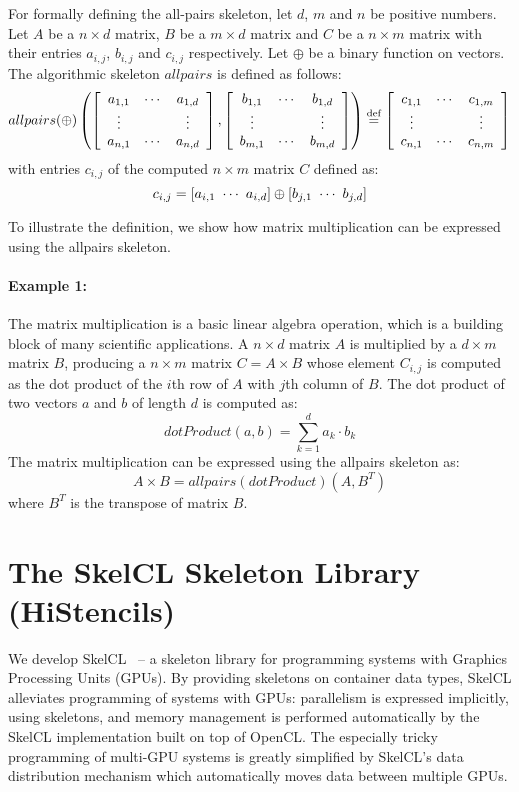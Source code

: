For formally defining the all-pairs skeleton, let $d$, $m$ and $n$ be positive numbers.
  Let $A$ be a $n\times d$ matrix, $B$ be a $m\times d$ matrix and $C$ be a $n\times m$ matrix with their entries $a_{i,j}$, $b_{i,j}$ and $c_{i,j}$ respectively.
  Let $\oplus$ be a binary function on vectors. %
  The algorithmic skeleton $allpairs$ is defined as follows:
  \[
	  allpairs(\oplus)\left(\DottedMatrix{a_{1,1}}{a_{1,d}}{a_{n,1}}{a_{n,d}},%
	                           \DottedMatrix{b_{1,1}}{b_{1,d}}{b_{m,1}}{b_{m,d}}\right)%
  	\eqdef \DottedMatrix{c_{1,1}}{c_{1,m}}{c_{n,1}}{c_{n,m}}
  \]
  with entries $c_{i,j}$ of the computed $n\times m$ matrix $C$ defined as:
  \[
	  c_{i,j} = \left[a_{i,1}\ \cdots\ a_{i,d}\right] \oplus \left[b_{j,1}\ \cdots\ b_{j,d}\right]
  \]

To illustrate the definition, we show how matrix multiplication can be expressed using the allpairs skeleton.

\paragraph{Example 1:}
The matrix multiplication is a basic linear algebra operation, which is a building block of many scientific applications.
A $n\times d$ matrix $A$ is multiplied by a $d\times m$ matrix $B$, producing a $n\times m$ matrix $C=A\times B$ whose element $C_{i,j}$ is computed as the dot product of the $i$th row of $A$ with $j$th column of $B$.
The dot product of two vectors $a$ and $b$ of length $d$ is computed as:
\begin{equation}
  dotProduct(a,b) = \sum_{k=1}^d a_k \cdot b_k
\end{equation}
The matrix multiplication can be expressed using the allpairs skeleton as:
\begin{equation}
  A\times B = allpairs(dotProduct)\left(A, B^T\right)
  \label{eq:mat_mult_allpairs}
\end{equation}
where $B^T$ is the transpose of matrix $B$.




\section{The SkelCL Skeleton Library (HiStencils)}
\label{sec:skelcl}
We develop SkelCL~\cite{StG-13b} -- a skeleton library for programming systems with Graphics Processing Units (GPUs).
By providing skeletons on container data types, SkelCL alleviates programming of systems with GPUs:
parallelism is expressed implicitly, using skeletons, and memory management is performed automatically by the SkelCL implementation built on top of OpenCL.
The especially tricky programming of multi-GPU systems is greatly simplified by SkelCL's data distribution mechanism which automatically moves data between multiple GPUs.

